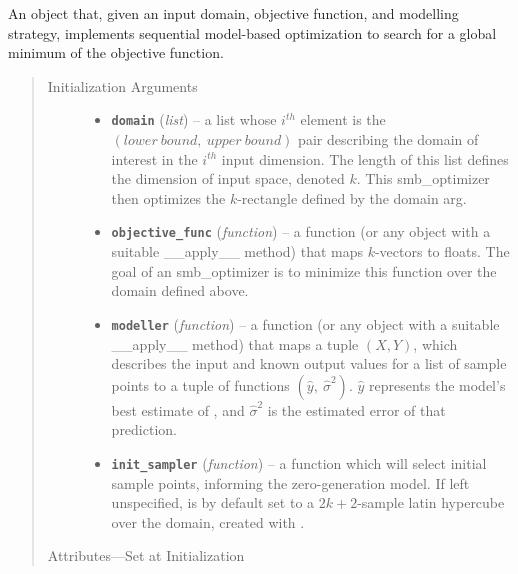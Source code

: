 \begin{fulllineitems}
\label{index:smbo.smb_optimizer.smb_optimizer}
An object that, given an input domain, objective function, and modelling strategy, implements sequential model-based optimization to search for a global minimum of the objective function.
\begin{quote}\begin{description}
\item[{Initialization Arguments}] \leavevmode\begin{itemize}
\item {} 
\textbf{\texttt{domain}} (\emph{list}) -- a list whose \(i^{th}\) element is the \((lower\ bound,\ upper\ bound)\) pair
describing the domain of interest in the \(i^{th}\) input dimension. The length
of this list defines the dimension of input space, denoted \(k\). This smb\_optimizer
then optimizes the \(k\)-rectangle defined by the domain arg.

\item {} 
\textbf{\texttt{objective\_func}} (\emph{function}) -- a function (or any object with a suitable \_\_apply\_\_ method)
that maps \(k\)-vectors to floats. The goal of an smb\_optimizer is to minimize this
function over the domain defined above.

\item {} 
\textbf{\texttt{modeller}} (\emph{function}) -- a function (or any object with a suitable \_\_apply\_\_ method) that maps a
tuple \((X,Y)\), which describes the input and known output values for a list of sample points to a tuple of functions
\((\hat{y},\ \hat{\sigma}^2)\).
\(\hat{y}\) represents the model's best estimate of , and \(\hat{\sigma}^2\)
is the estimated error of that prediction.

\item {} 
\textbf{\texttt{init\_sampler}} (\emph{function}) -- a function which will select initial sample points, informing the zero-generation model.
If left unspecified, is by default set to a \(2k+2\)-sample latin hypercube over the domain,
created with .

\end{itemize}


\item[{Attributes---Set at Initialization}] \leavevmode\begin{itemize}


\end{itemize}
\end{description}
\end{quote}
\end{fulllineitems}
